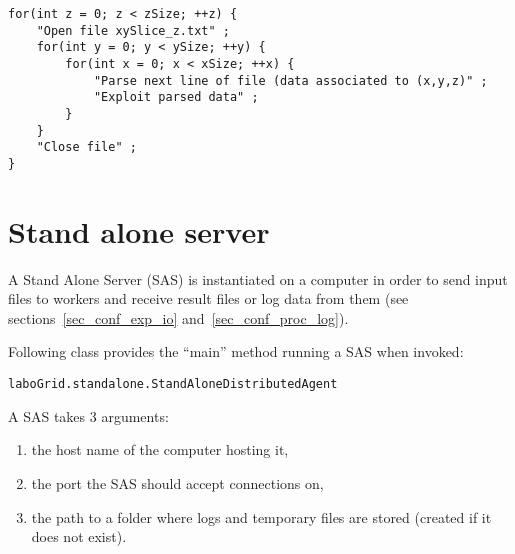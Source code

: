 \begin{Verbatim}[tabsize=2,frame=lines]
for(int z = 0; z < zSize; ++z) {
    "Open file xySlice_z.txt" ;
    for(int y = 0; y < ySize; ++y) {
        for(int x = 0; x < xSize; ++x) {
            "Parse next line of file (data associated to (x,y,z)" ;
            "Exploit parsed data" ;
        }
    }
    "Close file" ;
}
\end{Verbatim}


\section{Stand alone server}
\label{sec_add_sas}

A Stand Alone Server (SAS) is instantiated on a computer in order to send input
files to workers and receive result files or log data from them (see
sections~\ref{sec_conf_exp_io} and~\ref{sec_conf_proc_log}).

Following class provides the ``main'' method running a SAS when invoked:
\begin{center}
\texttt{laboGrid.standalone.StandAloneDistributedAgent}
\end{center}

A SAS takes 3 arguments:
\begin{enumerate}
	\item the host name of the computer hosting it,
	\item the port the SAS should accept connections on,
	\item the path to a folder where logs and temporary files are stored (created
	if it does not exist).
\end{enumerate}
